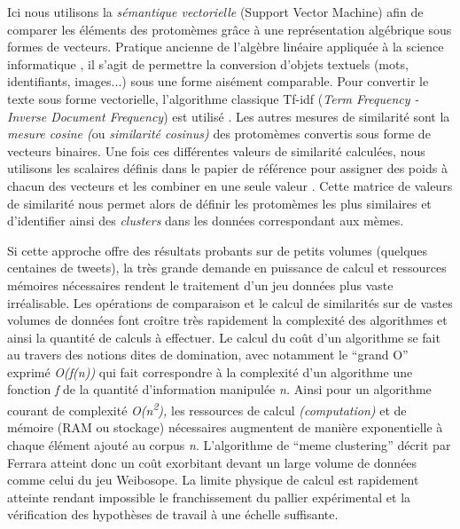 Ici nous utilisons la \textit{sémantique vectorielle} (Support Vector Machine) afin de comparer les éléments des protomèmes gr\^ace à une représentation algébrique sous formes de vecteurs. Pratique ancienne de l{\textquoteright}algèbre linéaire appliquée à la science informatique \citep{Salton1975}, il s{\textquoteright}agit de permettre la conversion d{\textquoteright}objets textuels (mots, identifiants, images...) sous une forme aisément comparable. Pour convertir le texte sous forme vectorielle, l{\textquoteright}algorithme classique Tf-idf (\textit{Term Frequency - Inverse Document Frequency}) est utilisé \citep{Soucy2005}. Les autres mesures de similarité sont la \textit{mesure cosine (}ou \textit{similarité cosinus) }des protomèmes convertis sous forme de vecteurs binaires. Une fois ces différentes valeurs de similarité calculées, nous utilisons les scalaires définis dans le papier de référence pour assigner des poids à chacun des vecteurs et les combiner en une seule valeur \citep{Ferrara2013}. Cette matrice de valeurs de similarité nous permet alors de définir les protomèmes les plus similaires et d{\textquoteright}identifier ainsi des \textit{clusters }dans les données correspondant aux mèmes.


Si cette approche offre des résultats probants sur de petits volumes (quelques centaines de tweets), la très grande demande en puissance de calcul et ressources mémoires nécessaires rendent le traitement d{\textquoteright}un jeu données plus vaste irréalisable. Les opérations de comparaison et le calcul de similarités sur de vastes volumes de données font cro\^itre très rapidement la complexité des algorithmes et ainsi la quantité de calculs à effectuer. Le calcul du co\^ut d{\textquoteright}un algorithme se fait au travers des notions dites de domination, avec notamment le {\textquotedblleft}grand O{\textquotedblright} exprimé \textit{O(f(n)) }qui fait correspondre à la complexité d{\textquoteright}un algorithme une fonction \textit{f} de la quantité d{\textquoteright}information manipulée \textit{n. }Ainsi pour un algorithme courant de complexité \textit{O(n}\textit{\textsuperscript{2}}\textit{), }les ressources de calcul \textit{(computation)} et de mémoire (RAM ou stockage) nécessaires augmentent de manière exponentielle à chaque élément ajouté au corpus \textit{n}. L{\textquoteright}algorithme de {\textquotedblleft}meme clustering{\textquotedblright} décrit par Ferrara atteint donc un co\^ut exorbitant devant un large volume de données comme celui du jeu Weibosope. La limite physique de calcul est rapidement atteinte rendant impossible le franchissement du pallier expérimental et la vérification des hypothèses de travail à une échelle suffisante.

